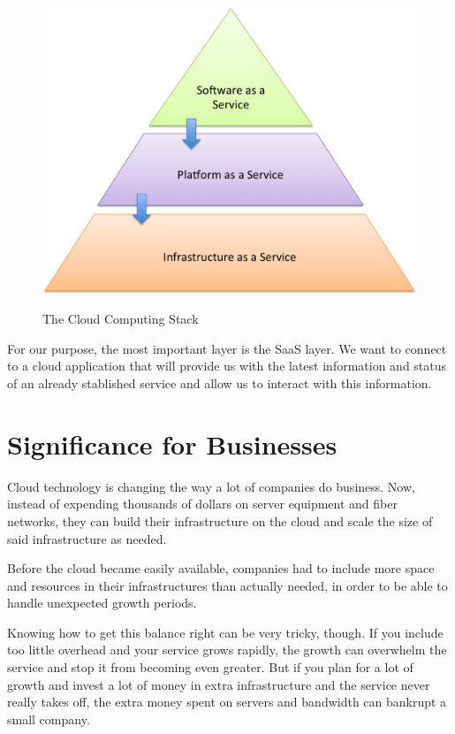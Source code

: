 \begin{figure}[H]
    \begin{center}
        {\includegraphics[width=.85\linewidth]{gfx/ipsaas}}
        \caption[The Cloud Computing Stack]{The Cloud Computing Stack}\label{fig:ipsaas}
    \end{center}
\end{figure}

For our purpose, the most important layer is the \ac{SaaS} layer. We want to connect to a cloud application that will provide us with the latest information and status of an already stablished service and allow us to interact with this information.

\section{Significance for Businesses}
Cloud technology is changing the way a lot of companies do business. Now, instead of expending thousands of dollars on server equipment and fiber networks, they can build their infrastructure on the cloud and scale the size of said infrastructure as needed. \cite{williams:2012}

Before the cloud became easily available, companies had to include more space and resources in their infrastructures than actually needed, in order to be able to handle unexpected growth periods.

Knowing how to get this balance right can be very tricky, though. If you include too little overhead and your service grows rapidly, the growth can overwhelm the service and stop it from becoming even greater. But if you plan for a lot of growth and invest a lot of money in extra infrastructure and the service never really takes off, the extra money spent on servers and bandwidth can bankrupt a small company.

